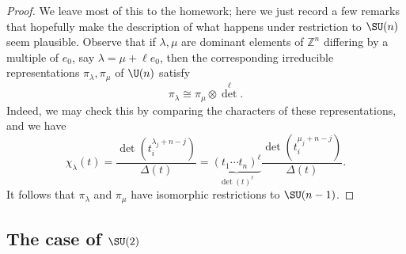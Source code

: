\documentclass[reqno]{amsart} 
\begin{document}
\begin{proof}
  We leave most of this to the homework; here we just record a few remarks that hopefully make the description of what happens under restriction to $\SU(n)$ seem plausible.  Observe that if $\lambda,\mu$ are dominant elements of $\mathbb{Z}^n$ differing by a multiple of $e_0$, say $\lambda = \mu + \ell e_0$, then the corresponding irreducible representations $\pi_\lambda, \pi_\mu$ of $\U(n)$ satisfy
  \begin{equation}\label{eq:}
    \pi_{\lambda} \cong \pi_{\mu} \otimes {\det}^{\ell}.
  \end{equation}
  Indeed, we may check this by comparing the characters of these representations, and we have
  \begin{equation}\label{eq:}
    \chi_\lambda(t)
    = \frac{\det(t_i^{\lambda_j + n - j})}{\Delta(t)}
    =
    \underbrace{(t_1 \dotsb t_n)^{\ell}}_{\det(t)^{\ell}}
    \frac{\det(t_i^{\mu_j + n - j})}{\Delta(t)}.
  \end{equation}
  It follows that $\pi_\lambda$ and $\pi_\mu$ have isomorphic restrictions to $\SU(n-1)$.
\end{proof}

\subsection{The case of \texorpdfstring{$\SU(2)$}{SU(2)}}\label{sec:case-su2}
\end{document}
